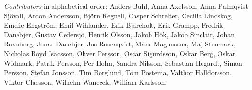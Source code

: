 \emph{Contributors} in alphabetical order:
Anders Buhl,
Anna Axelsson,
Anna Palmqvist Sjövall,
Anton Andersson,
Björn Regnell,
Casper Schreiter,
Cecilia Lindskog,
Emelie Engström,
Emil Wihlander,
Erik Bjäreholt,
Erik Grampp,
Fredrik Danebjer,
Gustav Cedersjö,
Henrik Olsson,
Jakob Hök,
Jakob Sinclair,
Johan Ravnborg,
Jonas Danebjer,
Jos Rosenqvist,
Måns Magnusson,
Maj Stenmark,
Nicholas Boyd Isacsson,
Oliver Persson,
Oscar Sigurdsson,
Oskar Berg,
Oskar Widmark,
Patrik Persson,
Per Holm,
Sandra Nilsson,
Sebastian Hegardt,
Simon Persson,
Stefan Jonsson,
Tim Borglund,
Tom Postema,
Valthor Halldorsson,
Viktor Claesson,
Wilhelm Wanecek,
William Karlsson.
